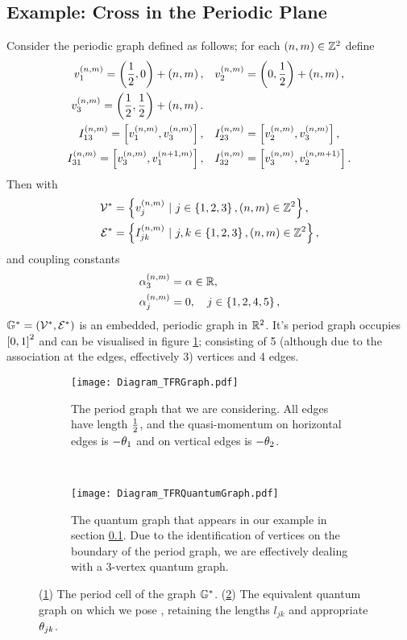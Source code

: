 \subsection{Example: Cross in the Periodic Plane} \label{ssec:ExampleCrossInPlane}
Consider the periodic graph defined as follows; for each $\left( n,m \right)\in\mathbb{Z}^2$ define
\begin{align*}
	v_1^{\left( n,m \right)} = \left( \frac{1}{2},0 \right) + \left( n,m \right), 
	&\quad v_2^{\left( n,m \right)} = \left( 0,\frac{1}{2} \right) + \left( n,m \right), \\
	v_3^{\left( n,m \right)} = \left( \frac{1}{2},\frac{1}{2} \right) + \left( n,m \right). & \\
	I_{13}^{\left( n,m \right)} = \left[ v_1^{\left( n,m \right)}, v_3^{\left( n,m \right)} \right],
	&\quad I_{23}^{\left( n,m \right)} = \left[ v_2^{\left( n,m \right)}, v_3^{\left( n,m \right)} \right], \\
	I_{31}^{\left( n,m \right)} = \left[ v_3^{\left( n,m \right)}, v_1^{\left( n+1,m \right)} \right],
	&\quad I_{32}^{\left( n,m \right)} = \left[ v_3^{\left( n,m \right)}, v_2^{\left( n,m+1 \right)} \right].
\end{align*}
Then with 
\begin{align*}
	\vertSet^* &= \clbracs{v_j^{\bracs{n,m}} \ \vert \ j\in\clbracs{1,2,3}, \bracs{n,m}\in\integers^2}, \\
	\edgeSet^* &= \clbracs{I_{jk}^{\bracs{n,m}} \ \vert \ j,k\in\clbracs{1,2,3}, \bracs{n,m}\in\integers^2},
\end{align*}
and coupling constants
\begin{align*}
	\alpha_3^{\left( n,m \right)} &= \alpha \in\mathbb{R}, \\
	\alpha_j^{\left( n,m \right)} &= 0, \quad j\in\left\{ 1,2,4,5 \right\},
\end{align*}
$\mathbb{G}^* = \left( \mathcal{V}^*,\mathcal{E}^* \right)$ is an embedded, periodic graph in $\mathbb{R}^2$.
It's period graph occupies $\left[ 0,1 \right]^2$ and can be visualised in figure \ref{fig:Diagram_TFRGraph}; consisting of 5 (although due to the association at the edges, effectively 3) vertices and 4 edges.
\begin{figure}[b!]
	\centering
	\begin{subfigure}[t]{0.45\textwidth}
		\centering
		\texttt{[image: Diagram\_TFRGraph.pdf]}
		\caption{\label{fig:Diagram_TFRGraph} The period graph that we are considering. All edges have length $\frac{1}{2}$, and the quasi-momentum on horizontal edges is $-\theta_1$ and on vertical edges is $-\theta_2$.}
	\end{subfigure}
	~
	\begin{subfigure}[t]{0.45\textwidth}
		\centering
		\texttt{[image: Diagram\_TFRQuantumGraph.pdf]}
		\caption{\label{fig:Diagram_TFRQuantumGraph} The quantum graph that appears in our example in section \ref{ssec:ExampleCrossInPlane}. Due to the identification of vertices on the boundary of the period graph, we are effectively dealing with a 3-vertex quantum graph.}
	\end{subfigure}
	\caption{\label{fig:5VertexCross} (\ref{fig:Diagram_TFRGraph}) The period cell of the graph $\mathbb{G}^*$. (\ref{fig:Diagram_TFRQuantumGraph}) The equivalent quantum graph on which we pose , retaining the lengths $l_{jk}$ and appropriate $\theta_{jk}$.}
\end{figure}
